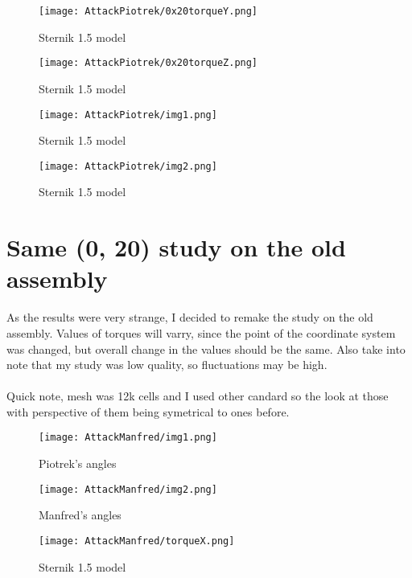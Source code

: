 \begin{figure}[H]
    \centering
    \texttt{[image: AttackPiotrek/0x20torqueY.png]}
    \caption{Sternik 1.5 model}
\end{figure}

\begin{figure}[H]
    \centering
    \texttt{[image: AttackPiotrek/0x20torqueZ.png]}
    \caption{Sternik 1.5 model}
\end{figure}

\begin{figure}[H]
    \centering
    \texttt{[image: AttackPiotrek/img1.png]}
    \caption{Sternik 1.5 model}
\end{figure}

\begin{figure}[H]
    \centering
    \texttt{[image: AttackPiotrek/img2.png]}
    \caption{Sternik 1.5 model}
\end{figure}

\section{Same (0, 20) study on the old assembly}
As the results were very strange, I decided to remake the study on the old assembly. 
Values of torques will varry, since the point of the coordinate system was changed, but overall
change in the values should be the same. Also take into note that my study was low quality, so 
fluctuations may be high.\\\\
Quick note, mesh was 12k cells and I used other candard so the look at those with perspective of
them being symetrical to ones before.

\begin{figure}[H]
    \centering
    \texttt{[image: AttackManfred/img1.png]}
    \caption{Piotrek's angles}
\end{figure}

\begin{figure}[H]
    \centering
    \texttt{[image: AttackManfred/img2.png]}
    \caption{Manfred's angles}
\end{figure}

\begin{figure}[H]
    \centering
    \texttt{[image: AttackManfred/torqueX.png]}
    \caption{Sternik 1.5 model}
\end{figure}

